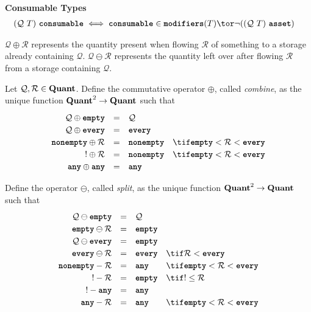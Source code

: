 \documentclass[dvipsnames, usenames, sigconf]{acmart}
\begin{document}
\framebox{$\tau~\consumable$} \textbf{Consumable Types}
\begin{align*}
    (\mathcal{Q}~T)~\consumable &\iff \consumable \in \modifiers(T) \tor \lnot((\mathcal{Q}~T)~\asset)
\end{align*}

$\mathcal{Q} \oplus \mathcal{R}$ represents the quantity present when flowing $\mathcal{R}$ of something to a storage already containing $\mathcal{Q}$.
$\mathcal{Q} \ominus \mathcal{R}$ represents the quantity left over after flowing $\mathcal{R}$ from a storage containing $\mathcal{Q}$.

\begin{definition}
    Let $\mathcal{Q}, \mathcal{R} \in \textbf{Quant}$.
    Define the commutative operator $\oplus$, called \emph{combine}, as the unique function $\textbf{Quant}^2 \to \textbf{Quant}$ such that
    \[
        \renewcommand\arraystretch{1.2}
        \begin{array}{r c l l l}
            \mathcal{Q} \oplus \emptyq & = & \mathcal{Q} & \\
            \mathcal{Q} \oplus \every & = & \every & \\
            \nonempty \oplus \mathcal{R} & = & \nonempty & \tif \emptyq < \mathcal{R} < \every \\
            \exactlyone \oplus \mathcal{R} & = & \nonempty & \tif \emptyq < \mathcal{R} < \every \\
            \any \oplus \any & = & \any &
        \end{array}
    \]

    Define the operator $\ominus$, called \emph{split}, as the unique function $\textbf{Quant}^2 \to \textbf{Quant}$ such that
    \[
        \renewcommand\arraystretch{1.2}
        \begin{array}{r c l l l}
            \mathcal{Q} \ominus \emptyq & = & \mathcal{Q} & \\
            \emptyq \ominus \mathcal{R} & = & \emptyq & \\
            \mathcal{Q} \ominus \every &= & \emptyq & \\
            \every \ominus \mathcal{R} &= & \every & \tif \mathcal{R} < \every \\
            \nonempty - \mathcal{R} &= & \any & \tif \emptyq < \mathcal{R} < \every \\
            \exactlyone - \mathcal{R} &= & \emptyq & \tif \exactlyone \leq \mathcal{R} \\
            \exactlyone - \any &= & \any & \\
            \any - \mathcal{R} &= & \any & \tif \emptyq < \mathcal{R} < \every \\
        \end{array}
    \]
\end{definition}
\end{document}
